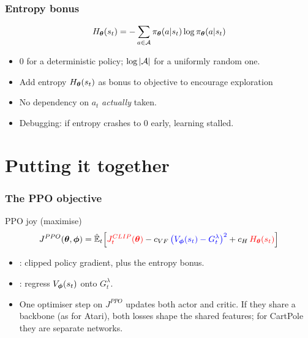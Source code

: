 \begin{frame}
    \frametitle{Entropy bonus}
    $$
    H_{{\boldsymbol{\theta}}}(s_t) = -\sum_{a \in \mathcal{A}} \pi_{\boldsymbol{\theta}}(a|s_t) \log \pi_{\boldsymbol{\theta}}(a|s_t)
    $$
    \begin{itemize}
        \item $0$ for a deterministic policy; $\log|\mathcal{A}|$ for a uniformly random one.
        \pause
        \item Add entropy $H_{{\boldsymbol{\theta}}}(s_t)$ as bonus to objective to encourage exploration
        \pause
        \item No dependency on $a_t$ \emph{actually} taken.
        \item Debugging: if entropy crashes to 0 early, learning stalled.
    \end{itemize}
\end{frame}

\section{Putting it together}

\begin{frame}
    \frametitle{The PPO objective}
    \begin{block}{PPO joy (maximise)}
        $$
        J^{PPO}({\boldsymbol{\theta}}, {\boldsymbol{\phi}}) = \hat{\mathbb{E}}_t\Big[
        \textcolor{red}{J^{CLIP}_t({\boldsymbol{\theta}})}
        - c_{VF}\, \textcolor{blue}{\big(V_{\boldsymbol{\phi}}(s_t) - G^\lambda_t\big)^2}
        + c_H\, \textcolor{red}{H_{{\boldsymbol{\theta}}}(s_t)}
        \Big]
        $$
    \end{block}
    \begin{itemize}
        \item {}: clipped policy gradient, plus the entropy bonus.
        \item {}: regress $V_{\boldsymbol{\phi}}(s_t)$ onto $G^\lambda_t$.
        \item One optimiser step on $J^{PPO}$ updates both actor and critic. If they share a
        backbone (as for Atari), both losses shape the shared features; for CartPole
        they are separate networks.
    \end{itemize}
\end{frame}

